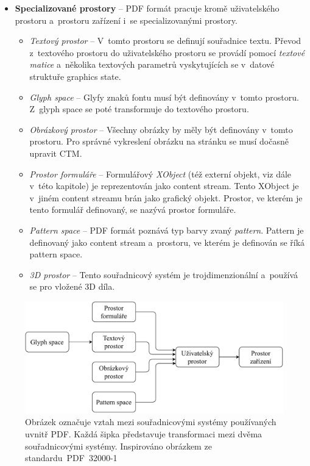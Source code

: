 \begin{itemize}
    \item \textbf{Specializované prostory} -- PDF formát pracuje kromě
    uživatelského prostoru a~prostoru zařízení i~se specializovanými prostory.
    \begin{itemize}
        \item \emph{Textový prostor} -- V~tomto prostoru se definují souřadnice
        textu. Převod z~textového prostoru do uživatelského prostoru se provádí
        pomocí \emph{textové matice} a~několika textových parametrů vyskytujících
        se v~datové struktuře graphics state.

        \item \emph{Glyph space} -- Glyfy znaků fontu musí být definovány v~tomto
        prostoru. Z~glyph space se poté transformuje do textového prostoru.
        
        \item \emph{Obrázkový prostor} -- Všechny obrázky by měly být definovány
        v~tomto prostoru. Pro správné vykreslení obrázku na stránku se musí dočasně
        upravit CTM.

        \item \emph{Prostor formuláře} -- Formulářový \emph{XObject} (též externí
        objekt, viz dále v~této kapitole) je
        reprezentován jako content stream. Tento XObject je v~jiném content streamu
        brán jako grafický objekt. Prostor, ve kterém je tento formulář definovaný,
        se nazývá prostor formuláře.

        \item \emph{Pattern space} -- PDF formát poznává typ barvy zvaný
        \emph{pattern}. Pattern je definovaný jako content stream a~prostoru, ve
        kterém je definován se říká pattern space.
        
        \item \emph{3D prostor} -- Tento souřadnicový systém je
        trojdimenzionální a~používá se pro vložené 3D díla.
    \end{itemize}
\end{itemize}

\begin{figure}[H]
    \label{coordinate_spaces}
    \includegraphics[width=\linewidth]{obrazky-figures/coordinate_spaces.pdf}
    \caption[Vztah mezi souřadnicovými systémy používaných uvnitř PDF]{Obrázek označuje vztah mezi souřadnicovými systémy používaných uvnitř PDF. Každá šipka představuje transformaci mezi dvěma souřadnicovými systémy. Inspirováno obrázkem ze standardu~PDF~32000-1~\cite{PDF32000-1:2008}}
\end{figure}


